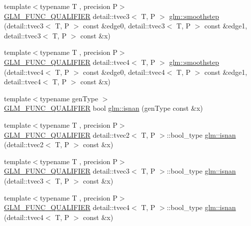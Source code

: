 \begin{DoxyCompactItemize}
\item 
{\footnotesize template$<$typename T , precision P$>$ }\\\hyperlink{setup_8hpp_a33fdea6f91c5f834105f7415e2a64407}{G\+L\+M\+\_\+\+F\+U\+N\+C\+\_\+\+Q\+U\+A\+L\+I\+F\+I\+ER} detail\+::tvec3$<$ T, P $>$ \hyperlink{namespaceglm_aa88da2d789f89fe917cbcd5855706707}{glm\+::smoothstep} (detail\+::tvec3$<$ T, P $>$ const \&edge0, detail\+::tvec3$<$ T, P $>$ const \&edge1, detail\+::tvec3$<$ T, P $>$ const \&x)
\item 
{\footnotesize template$<$typename T , precision P$>$ }\\\hyperlink{setup_8hpp_a33fdea6f91c5f834105f7415e2a64407}{G\+L\+M\+\_\+\+F\+U\+N\+C\+\_\+\+Q\+U\+A\+L\+I\+F\+I\+ER} detail\+::tvec4$<$ T, P $>$ \hyperlink{namespaceglm_a0eb15c7d255088706c5b00f7214512e0}{glm\+::smoothstep} (detail\+::tvec4$<$ T, P $>$ const \&edge0, detail\+::tvec4$<$ T, P $>$ const \&edge1, detail\+::tvec4$<$ T, P $>$ const \&x)
\item 
{\footnotesize template$<$typename gen\+Type $>$ }\\\hyperlink{setup_8hpp_a33fdea6f91c5f834105f7415e2a64407}{G\+L\+M\+\_\+\+F\+U\+N\+C\+\_\+\+Q\+U\+A\+L\+I\+F\+I\+ER} bool \hyperlink{group__core__func__common_ga8a9dec5200888766fbcb51b6a5898728}{glm\+::isnan} (gen\+Type const \&x)
\item 
{\footnotesize template$<$typename T , precision P$>$ }\\\hyperlink{setup_8hpp_a33fdea6f91c5f834105f7415e2a64407}{G\+L\+M\+\_\+\+F\+U\+N\+C\+\_\+\+Q\+U\+A\+L\+I\+F\+I\+ER} detail\+::tvec2$<$ T, P $>$\+::bool\+\_\+type \hyperlink{namespaceglm_a1b217bcbf88c251bc92fdcf38e5beae6}{glm\+::isnan} (detail\+::tvec2$<$ T, P $>$ const \&x)
\item 
{\footnotesize template$<$typename T , precision P$>$ }\\\hyperlink{setup_8hpp_a33fdea6f91c5f834105f7415e2a64407}{G\+L\+M\+\_\+\+F\+U\+N\+C\+\_\+\+Q\+U\+A\+L\+I\+F\+I\+ER} detail\+::tvec3$<$ T, P $>$\+::bool\+\_\+type \hyperlink{namespaceglm_a57c553ad2d64fe7bd1625d3dddcf65b7}{glm\+::isnan} (detail\+::tvec3$<$ T, P $>$ const \&x)
\item 
{\footnotesize template$<$typename T , precision P$>$ }\\\hyperlink{setup_8hpp_a33fdea6f91c5f834105f7415e2a64407}{G\+L\+M\+\_\+\+F\+U\+N\+C\+\_\+\+Q\+U\+A\+L\+I\+F\+I\+ER} detail\+::tvec4$<$ T, P $>$\+::bool\+\_\+type \hyperlink{namespaceglm_aeec38530b971a61c8e7eddbaef854498}{glm\+::isnan} (detail\+::tvec4$<$ T, P $>$ const \&x)

\end{DoxyCompactItemize}
